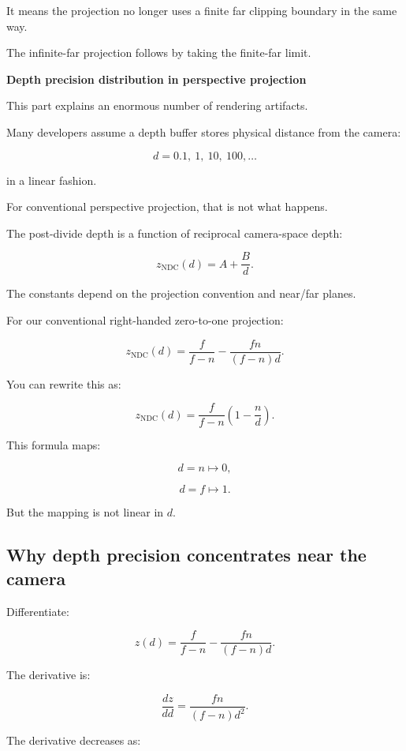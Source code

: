 It means the projection no longer uses a finite far clipping boundary in the same way.

The infinite-far projection follows by taking the finite-far limit.

\textbf{Depth precision distribution in perspective projection}

This part explains an enormous number of rendering artifacts.

Many developers assume a depth buffer stores physical distance from the camera:

\[
 d=0.1,\ 1,\ 10,\ 100,\ldots
\]

in a linear fashion.

For conventional perspective projection, that is not what happens.

The post-divide depth is a function of reciprocal camera-space depth:

\[
 \boxed{ z_{\mathrm{NDC}}(d)=A+\frac Bd }.
\]

The constants depend on the projection convention and near/far planes.

For our conventional right-handed zero-to-one projection:

\[
 \boxed{ z_{\mathrm{NDC}}(d) = \frac f{f-n} - \frac{fn}{(f-n)d} }.
\]

You can rewrite this as:

\[
 \boxed{ z_{\mathrm{NDC}}(d) = \frac f{f-n}\left(1-\frac nd\right) }.
\]

This formula maps:

\[
 d=n\mapsto0,
\]

\[
 d=f\mapsto1.
\]

But the mapping is not linear in \(d\).

\subsection{Why depth precision concentrates near the camera}\label{02-foundations-ii-ch033-why-depth-precision-concentrates-near-the-camera}

\hypertarget{02-foundations-ii-ch033-why-depth-precision-concentrates-near-the-camera}{}

Differentiate:

\[
 z(d)= \frac f{f-n} - \frac{fn}{(f-n)d}.
\]

The derivative is:

\[
 \boxed{ \frac{dz}{dd} = \frac{fn}{(f-n)d^2} }.
\]

The derivative decreases as:

